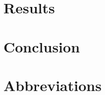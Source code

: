 \documentclass{bmcart}
\begin{document}
\section{Results}\label{sec:6}



\section{Conclusion}\label{sec:conclusion}


\section{Abbreviations}\label{sec:abbreviations}


% 


\end{document}
